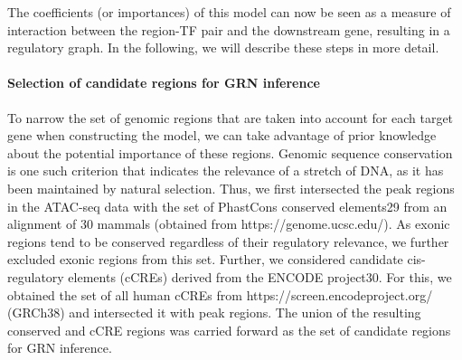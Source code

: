 The coefficients (or importances) of this model can now be seen as a measure of interaction between the region-TF pair and the downstream gene, resulting in a regulatory graph. In the following, we will describe these steps in more detail.
 
\paragraph{Selection of candidate regions for GRN inference}
To narrow the set of genomic regions that are taken into account for each target gene when constructing the model, we can take advantage of prior knowledge about the potential importance of these regions. Genomic sequence conservation is one such criterion that indicates the relevance of a stretch of DNA, as it has been maintained by natural selection. Thus, we first intersected the peak regions in the ATAC-seq data with the set of PhastCons conserved elements29 from an alignment of 30 mammals (obtained from https://genome.ucsc.edu/). As exonic regions tend to be conserved regardless of their regulatory relevance, we further excluded exonic regions from this set. Further, we considered candidate cis-regulatory elements (cCREs) derived from the ENCODE project30. For this, we obtained the set of all human cCREs from https://screen.encodeproject.org/ (GRCh38) and intersected it with peak regions. The union of the resulting conserved and cCRE regions was carried forward as the set of candidate regions for GRN inference.
 
